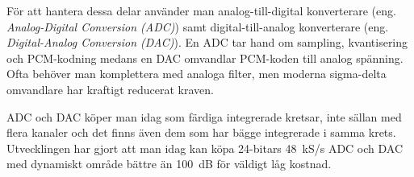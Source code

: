 För att hantera dessa delar använder man analog-till-digital konverterare
(eng. \emph{Analog-Digital Conversion (ADC)}) samt digital-till-analog
konverterare (eng. \emph{Digital-Analog Conversion (DAC)}).
En ADC tar hand om sampling, kvantisering och PCM-kodning medans en DAC
omvandlar PCM-koden till analog spänning.
Ofta behöver man komplettera med analoga filter, men moderna sigma-delta
omvandlare har kraftigt reducerat kraven.

ADC och DAC köper man idag som färdiga integrerade kretsar, inte sällan med
flera kanaler och det finns även dem som har bägge integrerade i samma krets.
Utvecklingen har gjort att man idag kan köpa 24-bitars 48~kS/s ADC och DAC med
dynamiskt område bättre än 100~dB för väldigt låg kostnad.
